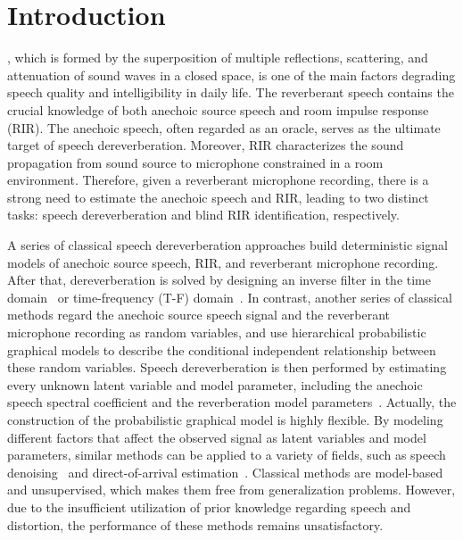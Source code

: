\section{Introduction}

, which is formed by the superposition of multiple reflections, scattering, and attenuation of sound waves in a closed space, is one of the main factors degrading speech quality and intelligibility in daily life.
The reverberant speech contains the crucial knowledge of both anechoic source speech and room impulse response (RIR).
The anechoic speech, often regarded as an oracle, serves as the ultimate target of speech dereverberation.
Moreover, RIR characterizes the sound propagation from sound source to microphone constrained in a room environment.
Therefore, given a reverberant microphone recording, there is a strong need to estimate the anechoic speech and RIR, leading to two distinct tasks: speech dereverberation and blind RIR identification, respectively.


A series of classical speech dereverberation approaches build deterministic signal models of anechoic source speech, RIR, and reverberant microphone recording.
After that, dereverberation is solved by designing an inverse filter in the time domain~\cite{nakatani2010speech} or time-frequency (T-F) domain~\cite{nakatani2010speech,nakatani2008blind,kinoshita2009suppression,yoshioka2012generalization,kodrasi2014frequency}.
In contrast, another series of classical methods regard the anechoic source speech signal and the reverberant microphone recording as random variables, and use hierarchical probabilistic graphical models to describe the conditional independent relationship between these random variables.
Speech dereverberation is then performed by estimating every unknown latent variable and model parameter, including the anechoic speech spectral coefficient and the reverberation model parameters~\cite{schmid2014variational,mohammadiha2015speech}.
Actually, the construction of the probabilistic graphical model is highly flexible. 
By modeling different factors that affect the observed signal as latent variables and model parameters, similar methods can be applied to a variety of fields, such as speech denoising~\cite{schmid2014variational,8462460,8492427} and direct-of-arrival estimation~\cite{yang2012off,wang2022off,wang2022joint}.
Classical methods are model-based and unsupervised, which makes them free from generalization problems.
However, due to the insufficient utilization of prior knowledge regarding speech and distortion, the performance of these methods remains unsatisfactory.


